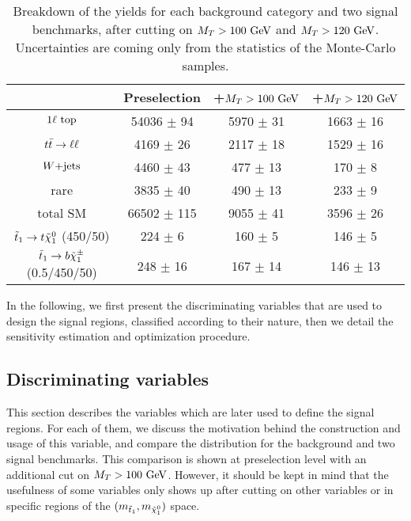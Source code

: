    \begin{table}[h!]
        \centering
        \begin{tabular}{|c|ccc|}
            \hline
                          & Preselection       & +$M_T > 100 ~\text{GeV}$   & +$M_T > 120 ~\text{GeV}$     \\
            \hline
        $1\ell~\text{top}$   & 54036 $\pm$ 94     &  5970 $\pm$ 31      &  1663 $\pm$ 16       \\
        $t\bar{t} \rightarrow \ell \ell$    &  4169 $\pm$ 26     &  2117 $\pm$ 18      &  1529 $\pm$ 16       \\
        $\text{$W$+jets}$          &  4460 $\pm$ 43     &   477 $\pm$ 13      &   170 $\pm$ 8        \\
        rare              &  3835 $\pm$ 40     &   490 $\pm$ 13      &   233 $\pm$ 9        \\
            \hline
        total SM          & 66502 $\pm$ 115    &  9055 $\pm$ 41      &  3596 $\pm$ 26       \\
            \hline
$\tilde{t}_1 \rightarrow t \tilde{\chi}_1^0$   (450/50) & 224 $\pm$ 6         & 160 $\pm$ 5   & 146 $\pm$ 5   \\
$\tilde{t}_1 \rightarrow b \tilde{\chi}_1^\pm$ (0.5/450/50) & 248 $\pm$ 16        & 167 $\pm$ 14  & 146 $\pm$ 13  \\
            \hline
        \end{tabular}
        \caption{Breakdown of the yields for each background category and two signal
        benchmarks, after cutting on $M_T > 100 ~\text{GeV}$ and $M_T > 120 ~\text{GeV}$. Uncertainties
        are coming only from the statistics of the Monte-Carlo samples.}
        \label{tab:MTcutImpact}
    \end{table}

    In the following, we first present the discriminating variables that are used to design
    the signal regions, classified according to their nature, then we detail the
    sensitivity estimation and optimization procedure.

    \subsection{Discriminating variables \label{sec:analysis_variables}}

        This section describes the variables which are later used to define the
        signal regions. For each of them, we discuss the motivation behind the construction
        and usage of this variable, and compare the distribution for the background
        and two signal benchmarks. This comparison is shown at preselection level with
        an additional cut on $M_T > 100~\text{GeV}$. However, it should be kept in mind that the
        usefulness of some variables only shows up after cutting on other variables or in
        specific regions of the $(m_{\tilde{t}_1},m_{\tilde{\chi}_1^0})$ space.

